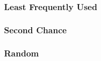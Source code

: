 \documentclass[paper=a4, fontsize=11pt]{scrartcl} %
\numberwithin{equation}{section} %
\numberwithin{figure}{section} %
\numberwithin{table}{section} %
\begin{document}
\subsubsection{Least Frequently Used}


\subsubsection{Second Chance}


\subsubsection{Random}


\end{document}
